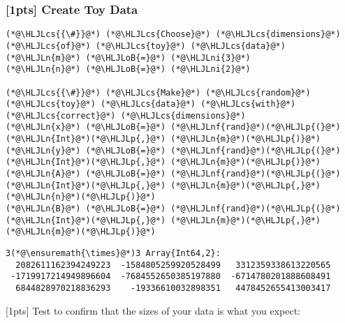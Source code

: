 \documentclass[12pt,a4paper]{article}
\newcommand{\HLJLn}[1]{#1}
\newcommand{\HLJLnf}[1]{\textcolor[RGB]{66,102,213}{#1}}
\newcommand{\HLJLni}[1]{\textcolor[RGB]{59,151,46}{#1}}
\newcommand{\HLJLoB}[1]{\textcolor[RGB]{102,102,102}{\textbf{#1}}}
\newcommand{\HLJLp}[1]{#1}
\newcommand{\HLJLcs}[1]{\textcolor[RGB]{153,153,119}{\textit{#1}}}
\begin{document}
\subsubsection{[1pts] Create Toy Data}

\begin{lstlisting}
(*@\HLJLcs{{\#}}@*) (*@\HLJLcs{Choose}@*) (*@\HLJLcs{dimensions}@*) (*@\HLJLcs{of}@*) (*@\HLJLcs{toy}@*) (*@\HLJLcs{data}@*)
(*@\HLJLn{m}@*) (*@\HLJLoB{=}@*) (*@\HLJLni{3}@*)
(*@\HLJLn{n}@*) (*@\HLJLoB{=}@*) (*@\HLJLni{2}@*)

(*@\HLJLcs{{\#}}@*) (*@\HLJLcs{Make}@*) (*@\HLJLcs{random}@*) (*@\HLJLcs{toy}@*) (*@\HLJLcs{data}@*) (*@\HLJLcs{with}@*) (*@\HLJLcs{correct}@*) (*@\HLJLcs{dimensions}@*)
(*@\HLJLn{x}@*) (*@\HLJLoB{=}@*) (*@\HLJLnf{rand}@*)(*@\HLJLp{(}@*)(*@\HLJLn{Int}@*)(*@\HLJLp{,}@*) (*@\HLJLn{m}@*)(*@\HLJLp{)}@*)
(*@\HLJLn{y}@*) (*@\HLJLoB{=}@*) (*@\HLJLnf{rand}@*)(*@\HLJLp{(}@*)(*@\HLJLn{Int}@*)(*@\HLJLp{,}@*) (*@\HLJLn{m}@*)(*@\HLJLp{)}@*)
(*@\HLJLn{A}@*) (*@\HLJLoB{=}@*) (*@\HLJLnf{rand}@*)(*@\HLJLp{(}@*)(*@\HLJLn{Int}@*)(*@\HLJLp{,}@*) (*@\HLJLn{m}@*)(*@\HLJLp{,}@*) (*@\HLJLn{n}@*)(*@\HLJLp{)}@*)
(*@\HLJLn{B}@*) (*@\HLJLoB{=}@*) (*@\HLJLnf{rand}@*)(*@\HLJLp{(}@*)(*@\HLJLn{Int}@*)(*@\HLJLp{,}@*) (*@\HLJLn{m}@*)(*@\HLJLp{,}@*) (*@\HLJLn{m}@*)(*@\HLJLp{)}@*)
\end{lstlisting}

\begin{lstlisting}
3(*@\ensuremath{\times}@*)3 Array{Int64,2}:
  2082611162394249223  -1584805259920528499   3312359338613220565
 -1719917214949896604  -7684552650385197880  -6714780201888608491
  6844828970218836293    -19336610032898351   4478452655413003417
\end{lstlisting}


[1pts] Test to confirm that the sizes of your data is what you expect:
\end{document}
